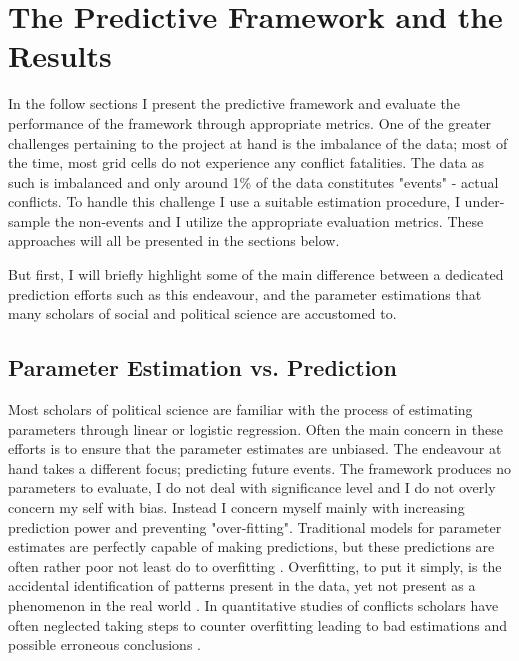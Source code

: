\documentclass[a4paper]{article}
\begin{document}
\section{The Predictive Framework and the Results}

In the follow sections I present the predictive framework and evaluate the performance of the framework through appropriate metrics. One of the greater challenges pertaining to the project at hand is the imbalance of the data; most of the time, most grid cells do not experience any conflict fatalities. The data as such is imbalanced and only around 1\% of the data constitutes "events" - actual conflicts. To handle this challenge I use a suitable estimation procedure, I under-sample the non-events and I utilize the appropriate evaluation metrics. These approaches will all be presented in the sections below.\par

But first, I will briefly highlight some of the main difference between a dedicated prediction efforts such as this endeavour, and the parameter estimations that many scholars of social and political science are accustomed to.\par

\subsection{Parameter Estimation vs. Prediction}

Most scholars of political science are familiar with the process of estimating parameters through linear or logistic regression. Often the main concern in these efforts is to ensure that the parameter estimates are unbiased. The endeavour at hand takes a different focus; predicting future events. The framework produces no parameters to evaluate, I do not deal with significance level and I do not overly concern my self with bias. Instead I concern myself mainly with increasing prediction power and preventing "over-fitting". Traditional models for parameter estimates are perfectly capable of making predictions, but these predictions are often rather poor not least do to overfitting \citep{Ward_Greenhill_Bakke_2010}. Overfitting, to put it simply, is the accidental identification of patterns present in the data, yet not present as a phenomenon in the real world \citep[166-168]{Mcelreath_2018}. In quantitative studies of conflicts scholars have often neglected taking steps to counter overfitting leading to bad estimations and possible erroneous conclusions \citep{king_zeng_2001b, Ward_Greenhill_Bakke_2010}.\par
\end{document}
